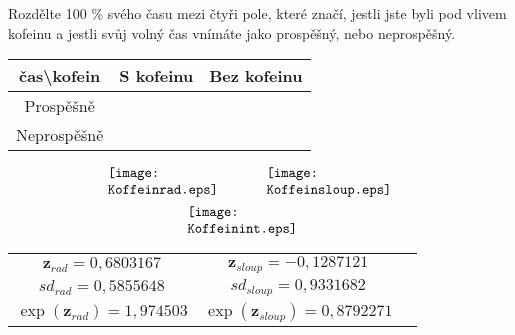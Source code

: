\documentclass[landscape,a0paper,fontscale=0.285]{baposter} %
\begin{document}
\begin{poster}
{%
Rozdělte 100 \% svého času mezi čtyři pole, které značí, jestli jste byli pod vlivem kofeinu a jestli svůj volný čas vnímáte jako prospěšný, nebo neprospěšný.
\begin{center}
\begin{tabular}{|c|c|c|}
\hline
čas\textbackslash kofein&S kofeinu&Bez kofeinu\\\hline
Prospěšně&&\\\hline
Neprospěšně&&\\\hline
\end{tabular}
\end{center}
$$
\begin{array}{cc}
\begin{minipage}{0.3\textwidth}
\texttt{[image: Koffeinrad.eps]}
\end{minipage}
&
\begin{minipage}{0.3\textwidth}
\texttt{[image: Koffeinsloup.eps]}
\end{minipage}
\end{array}
$$
$$
\begin{array}{c}
\begin{minipage}{0.3\textwidth}
\texttt{[image: Koffeinint.eps]}
\end{minipage}
\end{array}
$$
\begin{center}
\begin{tabular}{ccc}
$\mathbf{z}_{rad}=0,6803167$&$\mathbf{z}_{sloup}=-0,1287121$\\
$\textit{sd}_{rad}=0,5855648$&$\textit{sd}_{sloup}=0,9331682$\\
$\exp(\mathbf{z}_{rad})=1,974503$&$\exp(\mathbf{z}_{sloup})=0,8792271$\\
\end{tabular}


\end{center}}
\end{poster}
\end{document}
